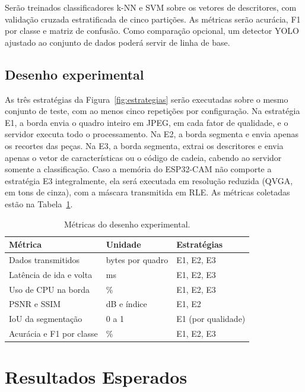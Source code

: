\documentclass[12pt]{article}
\begin{document}
Serão treinados classificadores k-NN e SVM sobre os vetores de descritores, com validação cruzada estratificada de cinco partições. As métricas serão acurácia, F1 por classe e matriz de confusão. Como comparação opcional, um detector YOLO ajustado ao conjunto de dados poderá servir de linha de base.

\subsection{Desenho experimental}

As três estratégias da Figura~\ref{fig:estrategias} serão executadas sobre o mesmo conjunto de teste, com ao menos cinco repetições por configuração. Na estratégia E1, a borda envia o quadro inteiro em JPEG, em cada fator de qualidade, e o servidor executa todo o processamento. Na E2, a borda segmenta e envia apenas os recortes das peças. Na E3, a borda segmenta, extrai os descritores e envia apenas o vetor de características ou o código de cadeia, cabendo ao servidor somente a classificação. Caso a memória do ESP32-CAM não comporte a estratégia E3 integralmente, ela será executada em resolução reduzida (QVGA, em tons de cinza), com a máscara transmitida em RLE. As métricas coletadas estão na Tabela~\ref{tab:metricas}.

\begin{table}[!htbp]
  \centering
  \caption{Métricas do desenho experimental.}
  \label{tab:metricas}
  \begin{tabular}{lll}
    \toprule
    \textbf{Métrica} & \textbf{Unidade} & \textbf{Estratégias} \\
    \midrule
    Dados transmitidos      & bytes por quadro & E1, E2, E3 \\
    Latência de ida e volta & ms               & E1, E2, E3 \\
    Uso de CPU na borda     & \%               & E1, E2, E3 \\
    PSNR e SSIM             & dB e índice      & E1, E2 \\
    IoU da segmentação      & 0 a 1            & E1 (por qualidade) \\
    Acurácia e F1 por classe & \%              & E1, E2, E3 \\
    \bottomrule
  \end{tabular}
\end{table}

\section{Resultados Esperados}
\label{sec:resultados}
\end{document}
